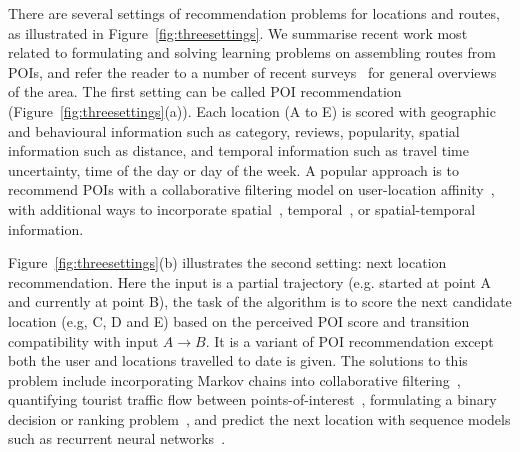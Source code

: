 

There are several settings of recommendation problems for locations and routes, as illustrated in Figure~\ref{fig:threesettings}.
We summarise recent work most related to formulating and solving learning problems on assembling routes from POIs,
and refer the reader to a number of recent surveys~\cite{bao2015recommendations,zheng2015trajectory,zheng2014urban} for general overviews of the area.
The first setting can be called POI recommendation (Figure~\ref{fig:threesettings}(a)). Each location (A to E) is scored with geographic and behavioural information such as category, reviews, popularity, spatial information such as distance, and temporal information such as travel time uncertainty, time of the day or day of the week.
A popular approach is to recommend POIs with a collaborative filtering model
on user-location affinity~\cite{shi2011personalized}, with additional ways to incorporate spatial~\cite{lian2014geomf,liu2014exploiting}, temporal~\cite{yuan2013timeaware,hsieh2014mining,gao2013temporal}, or spatial-temporal~\cite{yuan2014graph} information.

Figure~\ref{fig:threesettings}(b) illustrates the second setting: next location recommendation.
Here the input is a partial trajectory (e.g. started at point A and currently at point B), the task of the algorithm is to score the next candidate location (e.g, C, D and E) based on the perceived POI score and transition compatibility with input $A\rightarrow B$.
It is a variant of POI recommendation except both the user and locations travelled to date is given. The solutions to this problem include incorporating Markov chains into collaborative filtering~\cite{fpmc10,ijcai13,zhang2015location},
quantifying tourist traffic flow between points-of-interest~\cite{zheng2012patterns},
formulating a binary decision or ranking problem~\cite{baraglia2013learnext}, and predict the next location with sequence models such as recurrent neural networks~\cite{aaai16}.


